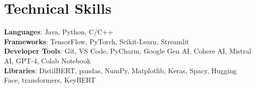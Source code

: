 \documentclass[letterpaper,11pt]{article}
\begin{document}
\section{Technical Skills}
 \begin{itemize}[leftmargin=0.15in, label={}]
    \small{\item{
     \textbf{Languages}{: Java, Python, C/C++} \\
     \textbf{Frameworks}{: TensorFlow, PyTorch, Scikit-Learn, Streamlit} \\
     \textbf{Developer Tools}{: Git, VS Code, PyCharm, Google Gen AI, Cohere AI, Mistral AI, GPT-4, Colab Notebook} \\
     \textbf{Libraries}{: DistilBERT, pandas, NumPy, Matplotlib, Keras, Spacy, Hugging Face, transformers, KeyBERT}
    }}
 \end{itemize}

\end{document}
